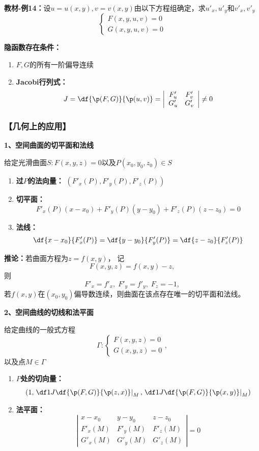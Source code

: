 {\bf 教材-例14：}设$u=u(x,y),v=v(x,y)$由以下方程组确定，求$u'_x,u'_y$和$v'_x,v'_y$
$$
	\left\{\begin{array}{l}
		F(x,y,u,v)=0\\ G(x,y,u,v)=0
	\end{array}\right.
$$

{\bf 隐函数存在条件：}
\begin{enumerate}[(1)]
  \setlength{\itemindent}{1cm}
  \item $F,G$的所有一阶偏导连续
  \item {\bf Jacobi行列式：}
  $${J=\df{\p(F,G)}{\p(u,v)}=\left|\begin{array}{cc}
		F'_u & F'_v\\ G'_u & G'_v
	\end{array}\right|\ne 0}$$
\end{enumerate}

\subsubsection{【几何上的应用】}

{\bf 1、空间曲面的切平面和法线}

给定光滑曲面$S:F(x,y,z)=0$以及$P(x_0,y_0,z_0)\in S$

\begin{enumerate}[(1)]
  \setlength{\itemindent}{1cm}
  \item {\bf 过$P$的法向量：} ${(F'_x(P),F'_y(P),F'_z(P))}$ 
  \item {\bf 切平面：}
  	$$F'_x(P)(x-x_0)+F'_y(P)(y-y_0)+F'_z(P)(z-z_0)=0$$ 
  \item {\bf 法线：}
  	$$\df{x-x_0}{F'_x(P)}=\df{y-y_0}{F'_y(P)}=\df{z-z_0}{F'_z(P)}$$
\end{enumerate}

{\bf 推论：}若曲面方程为$z=f(x,y)$， 记
$$F(x,y,z)=f(x,y)-z,$$
则
$$F'_x=f'_x,\;F'_y=f'_y,\;F_z=-1,$$
若$f(x,y)$在$(x_0,y_0)$偏导数连续，则曲面在该点存在唯一的切平面和法线。

{\bf 2、空间曲线的切线和法平面}

给定曲线的一般式方程
$$\Gamma: \left\{\begin{array}{l}
	F(x,y,z)=0\\ G(x,y,z)=0
\end{array}\right.,$$
以及点$M\in\Gamma$

\begin{enumerate}[(1)]
  \setlength{\itemindent}{1cm}
  \item {\bf $P$处的切向量：} 
  $$\left(1,\left.\df 1J\df{\p(F,G)}{\p(z,x)}\right|_M,
  \left.\df 1J\df{\p(F,G)}{\p(x,y)}\right|_M\right)$$
  \item {\bf 法平面：}
  $$\left|
  		\begin{array}{ccc}
  			x-x_0 & y-y_0 & z-z_0\\
  			F'_x(M) & F'_y(M) & F'_z(M)\\
  			G'_x(M) & G'_y(M) & G'_z(M)
  		\end{array}
  	\right|=0$$
\end{enumerate}

